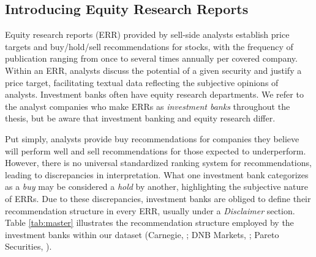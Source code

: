 
\subsection{Introducing Equity Research Reports}
\label{sec:ERR}

Equity research reports (ERR) provided by sell-side analysts establish price targets and buy/hold/sell recommendations for stocks, with the frequency of publication ranging from once to several times annually per covered company. Within an ERR, analysts discuss the potential of a given security and justify a price target, facilitating textual data reflecting the subjective opinions of analysts. Investment banks often have equity research departments. We refer to the analyst companies who make ERRs as \textit{investment banks} throughout the thesis, but be aware that investment banking and equity research differ.

Put simply, analysts provide buy recommendations for companies they believe will perform well and sell recommendations for those expected to underperform. However, there is no universal standardized ranking system for recommendations, leading to discrepancies in interpretation. %
What one investment bank categorizes as a \textit{buy} may be considered a \textit{hold} by another, highlighting the subjective nature of ERRs. Due to these discrepancies, investment banks are obliged to define their recommendation structure in every ERR, usually under a \textit{Disclaimer} section. %
Table \ref{tab:master} illustrates the recommendation structure employed by the investment banks within our dataset (Carnegie, \cite*{carnegie}; DNB Markets, \cite*{dnb}; Pareto Securities, \cite*{pareto}). 

